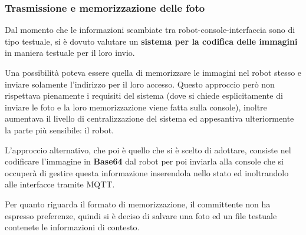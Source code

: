 \subsubsection{Trasmissione e memorizzazione delle foto}

Dal momento che le informazioni scambiate tra robot-console-interfaccia sono di tipo testuale, si è dovuto valutare un \textbf{sistema per la codifica delle immagini} in maniera testuale per il loro invio.

Una possibilità poteva essere quella di memorizzare le immagini nel robot stesso e inviare solamente l'indirizzo per il loro accesso.
Questo approccio però non rispettava pienamente i requisiti del sistema (dove si chiede esplicitamente di inviare le foto e la loro memorizzazione viene fatta sulla console), inoltre aumentava il livello di centralizzazione del sistema ed appesantiva ulteriormente la parte più sensibile: il robot.

L'approccio alternativo, che poi è quello che si è scelto di adottare, consiste nel codificare l'immagine in \textbf{Base64} dal robot per poi inviarla alla console che si occuperà di gestire questa informazione inserendola nello stato ed inoltrandolo alle interfacce tramite MQTT\@.

Per quanto riguarda il formato di memorizzazione, il committente non ha espresso preferenze, quindi si è deciso di salvare una foto ed un file testuale contenete le informazioni di contesto.

